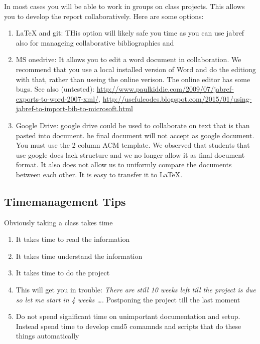 In most cases you will be able to work in groups on class projects. This
allows you to develop the report collaboratively. Here are some options:

\begin{enumerate}
\tightlist
\item
  LaTeX and git: THis option will likely safe you time as you can use
  jabref also for manageing collaborative bibliographies and
\item
  MS onedrive: It allows you to edit a word document in collaboration.
  We recommend that you use a local installed version of Word and do the
  editiong with that, rather than useing the online verison. The online
  editor has some bugs. See also (untested):
  \url{http://www.paulkiddie.com/2009/07/jabref-exports-to-word-2007-xml/},
  \url{http://usefulcodes.blogspot.com/2015/01/using-jabref-to-import-bib-to-microsoft.html}
\item
  Google Drive: google drive could be used to collaborate on text that
  is than pasted into document. he final document will not accept as
  google document. You must use the 2 column ACM template. We observed
  that students that use google docs lack structure and we no longer
  allow it as final document format. It also does not allow us to
  uniformly compare the documents between each other. It is easy to
  transfer it to LaTeX.
\end{enumerate}

\subsection{Timemanagement Tips}\label{timemanagement-tips}

Obviously taking a class takes time

\begin{enumerate}
\tightlist
\item
  It takes time to read the information
\item
  It takes time understand the information
\item
  It takes time to do the project
\item
  This will get you in trouble: \emph{There are still 10 weeks left till
  the project is due so let me start in 4 weeks \ldots{}}. Postponing
  the project till the last moment
\item
  Do not spend significant time on unimportant documentation and setup.
  Instead spend time to develop cmd5 comamnds and scripts that do these
  things automatically
\end{enumerate}


